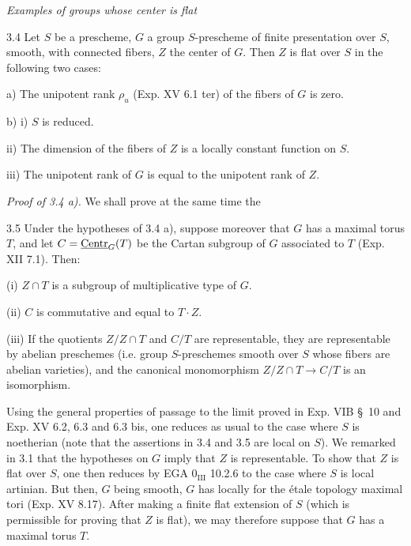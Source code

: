 \par\noindent\emph{Examples of groups whose center is flat}
\begin{proposition}{3.4}\label{XVI.3.4}
Let $S$ be a prescheme, $G$ a group $S$-prescheme of finite presentation over $S$, smooth, with connected fibers, $Z$ the center of $G$. Then $Z$ is flat over $S$ in the following two cases:

\noindent a) The unipotent rank $\rho_u$ (Exp. XV 6.1 ter) of the fibers of $G$ is zero.

\noindent b) i) $S$ is reduced.

\noindent\hspace*{1em}ii) The dimension of the fibers of $Z$ is a locally constant function on $S$.

\noindent\hspace*{1em}iii) The unipotent rank of $G$ is equal to the unipotent rank of $Z$.
\end{proposition}
\par\noindent\emph{Proof of 3.4 a).}
We shall prove at the same time the
\begin{proposition}{3.5}\label{XVI.3.5}
Under the hypotheses of 3.4 a), suppose moreover that $G$ has a maximal torus $T$, and let $C=\underline{\mathrm{Centr}}_G(T)$ be the Cartan subgroup of $G$ associated to $T$ (Exp. XII 7.1). Then:

\noindent (i) $Z\cap T$ is a subgroup of multiplicative type of $G$.

\noindent (ii) $C$ is commutative and equal to $T\cdot Z$.

\noindent (iii) If the quotients $Z/Z\cap T$ and $C/T$ are representable, they are representable by abelian preschemes (i.e. group $S$-preschemes smooth over $S$ whose fibers are abelian varieties), and the canonical monomorphism $Z/Z\cap T\to C/T$ is an isomorphism.
\end{proposition}
Using the general properties of passage to the limit proved in Exp. VIB \S\ 10 and Exp. XV 6.2, 6.3 and 6.3 bis, one reduces as usual to the case where $S$ is noetherian (note that the assertions in 3.4 and 3.5 are local on $S$). We remarked in 3.1 that the hypotheses on $G$ imply that $Z$ is representable. To show that $Z$ is flat over $S$, one then reduces by EGA $0_{\mathrm{III}}$ 10.2.6 to the case where $S$ is local artinian. But then, $G$ being smooth, $G$ has locally for the étale topology maximal tori (Exp. XV 8.17). After making a finite flat extension of $S$ (which is permissible for proving that $Z$ is flat), we may therefore suppose that $G$ has a maximal torus $T$.

